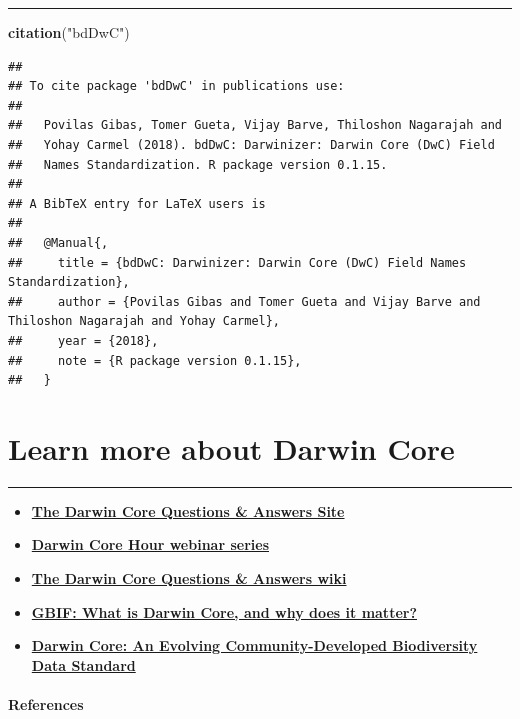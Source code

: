 \documentclass[]{book}
\newenvironment{Shaded}{\begin{snugshade}}{\end{snugshade}}
\newcommand{\KeywordTok}[1]{\textcolor[rgb]{0.13,0.29,0.53}{\textbf{#1}}}
\newcommand{\StringTok}[1]{\textcolor[rgb]{0.31,0.60,0.02}{#1}}
\newcommand{\NormalTok}[1]{#1}
\theoremstyle{definition}
\theoremstyle{definition}
\theoremstyle{definition}
\theoremstyle{remark}
\begin{document}
\begin{center}\rule{0.5\linewidth}{\linethickness}\end{center}

\begin{Shaded}
\begin{Highlighting}[]
\KeywordTok{citation}\NormalTok{(}\StringTok{"bdDwC"}\NormalTok{)}
\end{Highlighting}
\end{Shaded}

\begin{verbatim}
## 
## To cite package 'bdDwC' in publications use:
## 
##   Povilas Gibas, Tomer Gueta, Vijay Barve, Thiloshon Nagarajah and
##   Yohay Carmel (2018). bdDwC: Darwinizer: Darwin Core (DwC) Field
##   Names Standardization. R package version 0.1.15.
## 
## A BibTeX entry for LaTeX users is
## 
##   @Manual{,
##     title = {bdDwC: Darwinizer: Darwin Core (DwC) Field Names Standardization},
##     author = {Povilas Gibas and Tomer Gueta and Vijay Barve and Thiloshon Nagarajah and Yohay Carmel},
##     year = {2018},
##     note = {R package version 0.1.15},
##   }
\end{verbatim}

\hypertarget{learn-more-about-darwin-core}{\chapter{Learn more about
Darwin Core}\label{learn-more-about-darwin-core}}

\begin{center}\rule{0.5\linewidth}{\linethickness}\end{center}

\begin{itemize}
\item
  \textbf{\href{https://github.com/tdwg/dwc-qa\%20target=\%22_blank\%22}{The
  Darwin Core Questions \& Answers Site}}
\item
  \textbf{\href{https://github.com/tdwg/dwc-qa/wiki/Webinars\%20target=\%22_blank\%22}{Darwin
  Core Hour webinar series}}
\item
  \textbf{\href{https://github.com/tdwg/dwc-qa/wiki\%20target=\%22_blank\%22}{The
  Darwin Core Questions \& Answers wiki}}
\item
  \textbf{\href{https://www.gbif.org/darwin-core\%20target=\%22_blank\%22}{GBIF:
  What is Darwin Core, and why does it matter?}}
\item
  \textbf{\href{https://doi.org/10.1371/journal.pone.0029715\%20target=\%22_blank\%22}{Darwin
  Core: An Evolving Community-Developed Biodiversity Data Standard}
  \citep{DwC-paper} }
\end{itemize}

\subsubsection*{References}\label{references-1}


\end{document}
